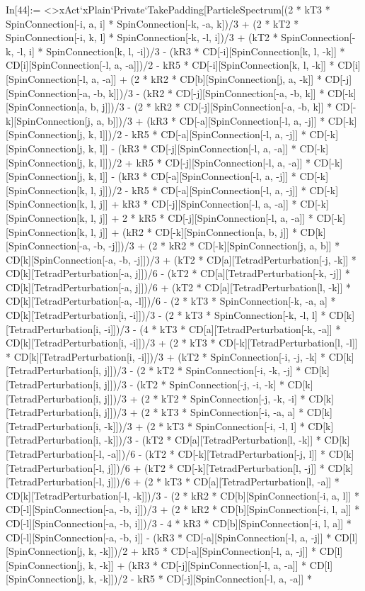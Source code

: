In[44]:= <>xAct`xPlain`Private`TakePadding[ParticleSpectrum[(2 * kT3 * SpinConnection[-i, a, i] * SpinConnection[-k, -a, k])/3 + (2 * kT2 * SpinConnection[-i, k, l] * SpinConnection[-k, -l, i])/3 + (kT2 * SpinConnection[-k, -l, i] * SpinConnection[k, l, -i])/3 - (kR3 * CD[-i][SpinConnection[k, l, -k]] * CD[i][SpinConnection[-l, a, -a]])/2 - kR5 * CD[-i][SpinConnection[k, l, -k]] * CD[i][SpinConnection[-l, a, -a]] + (2 * kR2 * CD[b][SpinConnection[j, a, -k]] * CD[-j][SpinConnection[-a, -b, k]])/3 - (kR2 * CD[-j][SpinConnection[-a, -b, k]] * CD[-k][SpinConnection[a, b, j]])/3 - (2 * kR2 * CD[-j][SpinConnection[-a, -b, k]] * CD[-k][SpinConnection[j, a, b]])/3 + (kR3 * CD[-a][SpinConnection[-l, a, -j]] * CD[-k][SpinConnection[j, k, l]])/2 - kR5 * CD[-a][SpinConnection[-l, a, -j]] * CD[-k][SpinConnection[j, k, l]] - (kR3 * CD[-j][SpinConnection[-l, a, -a]] * CD[-k][SpinConnection[j, k, l]])/2 + kR5 * CD[-j][SpinConnection[-l, a, -a]] * CD[-k][SpinConnection[j, k, l]] - (kR3 * CD[-a][SpinConnection[-l, a, -j]] * CD[-k][SpinConnection[k, l, j]])/2 - kR5 * CD[-a][SpinConnection[-l, a, -j]] * CD[-k][SpinConnection[k, l, j]] + kR3 * CD[-j][SpinConnection[-l, a, -a]] * CD[-k][SpinConnection[k, l, j]] + 2 * kR5 * CD[-j][SpinConnection[-l, a, -a]] * CD[-k][SpinConnection[k, l, j]] + (kR2 * CD[-k][SpinConnection[a, b, j]] * CD[k][SpinConnection[-a, -b, -j]])/3 + (2 * kR2 * CD[-k][SpinConnection[j, a, b]] * CD[k][SpinConnection[-a, -b, -j]])/3 + (kT2 * CD[a][TetradPerturbation[-j, -k]] * CD[k][TetradPerturbation[-a, j]])/6 - (kT2 * CD[a][TetradPerturbation[-k, -j]] * CD[k][TetradPerturbation[-a, j]])/6 + (kT2 * CD[a][TetradPerturbation[l, -k]] * CD[k][TetradPerturbation[-a, -l]])/6 - (2 * kT3 * SpinConnection[-k, -a, a] * CD[k][TetradPerturbation[i, -i]])/3 - (2 * kT3 * SpinConnection[-k, -l, l] * CD[k][TetradPerturbation[i, -i]])/3 - (4 * kT3 * CD[a][TetradPerturbation[-k, -a]] * CD[k][TetradPerturbation[i, -i]])/3 + (2 * kT3 * CD[-k][TetradPerturbation[l, -l]] * CD[k][TetradPerturbation[i, -i]])/3 + (kT2 * SpinConnection[-i, -j, -k] * CD[k][TetradPerturbation[i, j]])/3 - (2 * kT2 * SpinConnection[-i, -k, -j] * CD[k][TetradPerturbation[i, j]])/3 - (kT2 * SpinConnection[-j, -i, -k] * CD[k][TetradPerturbation[i, j]])/3 + (2 * kT2 * SpinConnection[-j, -k, -i] * CD[k][TetradPerturbation[i, j]])/3 + (2 * kT3 * SpinConnection[-i, -a, a] * CD[k][TetradPerturbation[i, -k]])/3 + (2 * kT3 * SpinConnection[-i, -l, l] * CD[k][TetradPerturbation[i, -k]])/3 - (kT2 * CD[a][TetradPerturbation[l, -k]] * CD[k][TetradPerturbation[-l, -a]])/6 - (kT2 * CD[-k][TetradPerturbation[-j, l]] * CD[k][TetradPerturbation[-l, j]])/6 + (kT2 * CD[-k][TetradPerturbation[l, -j]] * CD[k][TetradPerturbation[-l, j]])/6 + (2 * kT3 * CD[a][TetradPerturbation[l, -a]] * CD[k][TetradPerturbation[-l, -k]])/3 - (2 * kR2 * CD[b][SpinConnection[-i, a, l]] * CD[-l][SpinConnection[-a, -b, i]])/3 + (2 * kR2 * CD[b][SpinConnection[-i, l, a]] * CD[-l][SpinConnection[-a, -b, i]])/3 - 4 * kR3 * CD[b][SpinConnection[-i, l, a]] * CD[-l][SpinConnection[-a, -b, i]] - (kR3 * CD[-a][SpinConnection[-l, a, -j]] * CD[l][SpinConnection[j, k, -k]])/2 + kR5 * CD[-a][SpinConnection[-l, a, -j]] * CD[l][SpinConnection[j, k, -k]] + (kR3 * CD[-j][SpinConnection[-l, a, -a]] * CD[l][SpinConnection[j, k, -k]])/2 - kR5 * CD[-j][SpinConnection[-l, a, -a]] * 